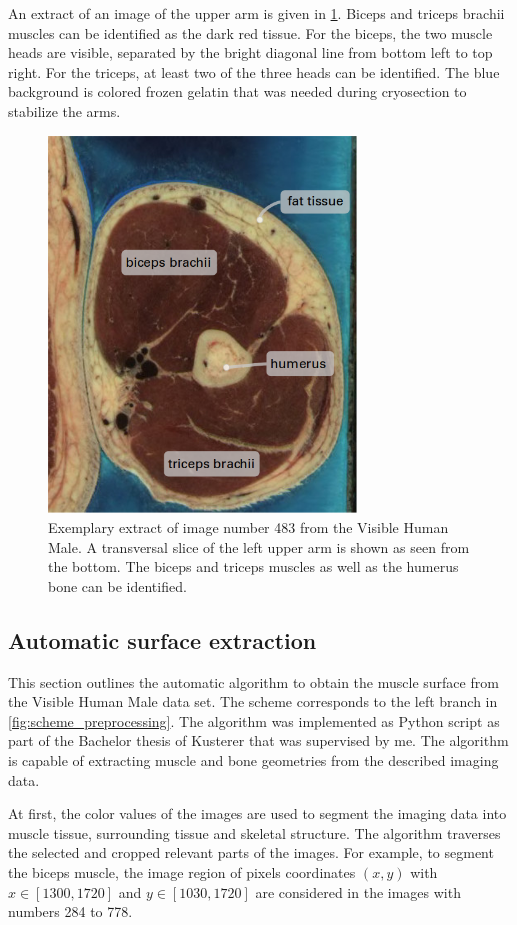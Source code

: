 An extract of an image of the upper arm is given in \cref{fig:vhp_image}. 
Biceps and triceps brachii muscles can be identified as the dark red tissue. For the biceps, the two muscle heads are visible, separated by the bright diagonal line from bottom left to top right. For the triceps, at least two of the three heads can be identified. The blue background is colored frozen gelatin that was needed during cryosection to stabilize the arms.

\begin{figure}%
  \centering%
  \includegraphics[height=10cm]{images/fiber_creation/vhp.png}%
  \caption{Exemplary extract of image number 483 from the Visible Human Male. A transversal slice of the left upper arm is shown as seen from the bottom. The biceps and triceps muscles as well as the humerus bone can be identified. }%
  \label{fig:vhp_image}%
\end{figure}%

\subsection{Automatic surface extraction}
This section outlines the automatic algorithm to obtain the muscle surface from the Visible Human Male data set. The scheme corresponds to the left branch in \cref{fig:scheme_preprocessing}. The algorithm was implemented as Python script as part of the Bachelor thesis of Kusterer \cite{Kusterer} that was supervised by me.
The algorithm is capable of extracting muscle and bone geometries from the described imaging data.

At first, the color values of the images are used to segment the imaging data into muscle tissue, surrounding tissue and skeletal structure. The algorithm traverses the selected and cropped relevant parts of the images. For example, to segment the biceps muscle, the image region of pixels coordinates $(x,y)$ with $x \in [1300,1720] $ and $ y\in[1030,1720]$ are considered in the images with numbers 284 to 778. 

